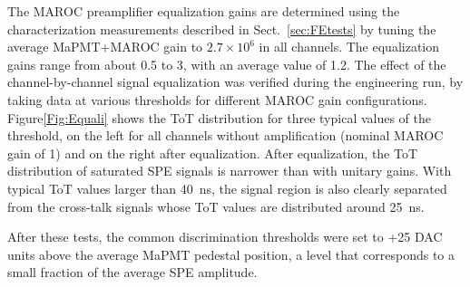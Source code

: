 \documentclass[5p,times,twocolumn]{elsarticle}
\begin{document}
The MAROC preamplifier equalization gains are determined using the characterization measurements described in
Sect.~\ref{sec:FEtests} by tuning the average MaPMT+MAROC gain to $2.7 \times 10^6$ in all channels. The
equalization gains range from about 0.5 to 3, with an average value of 1.2. The effect of the channel-by-channel signal
equalization was verified during the engineering run, by taking data at various thresholds for different MAROC gain
configurations.  Figure\ref{Fig:Equali} shows the ToT distribution for three typical values of the threshold, on the left
for all channels without amplification (nominal MAROC gain of 1) and on the right after equalization. After equalization,
the ToT distribution of saturated SPE signals is narrower than with unitary gains.  With typical ToT values larger than
40~ns, the signal region is also clearly separated from the cross-talk signals whose ToT values are distributed around
25~ns.

After these tests, the common discrimination thresholds were set to +25 DAC units above the average MaPMT
pedestal position, a level that corresponds to a small fraction of the average SPE amplitude.
\end{document}
